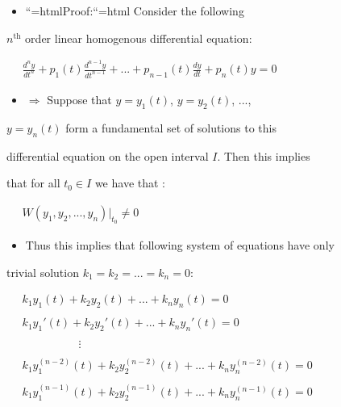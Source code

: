 \begin{itemize}
    \item ``{=html}Proof:``{=html} Consider the following
\end{itemize}
    $n^{\mathrm{th}}$ order linear homogenous differential equation:



$\begin{aligned} \quad \frac{d^ny}{dt^n} + p_1(t) \frac{d^{n-1}y}{dt^{n-1}} + ... + p_{n-1}(t) \frac{dy}{dt} + p_n(t)y = 0 \end{aligned}$



\begin{itemize}
    \item $\Rightarrow$ Suppose that $y = y_1(t)$, $y = y_2(t)$, ...,
\end{itemize}
    $y = y_n(t)$ form a fundamental set of solutions to this

    differential equation on the open interval $I$. Then this implies

    that for all $t_0 \in I$ we have that :



$\begin{aligned} \quad W(y_1, y_2, ..., y_n)  \bigg|_{t_0} \neq 0 \end{aligned}$



\begin{itemize}
    \item Thus this implies that following system of equations have only
\end{itemize}
    trivial solution $k_1 = k_2 = ... = k_n = 0$:



$\begin{aligned} \quad k_1y_1(t) + k_2y_2(t) + ... + k_ny_n(t) = 0 \\\\ \quad k_1y_1'(t) + k_2y_2'(t) + ... + k_ny_n'(t) = 0 \\\\ \quad \quad \quad \quad \quad \quad \vdots \quad \quad \quad \quad \quad \quad \\\\ \quad k_1y_1^{(n-2)}(t) + k_2y_2^{(n-2)}(t) + ... + k_ny_n^{(n-2)}(t) = 0 \\\\ \quad k_1y_1^{(n-1)}(t) + k_2y_2^{(n-1)}(t) + ... + k_ny_n^{(n-1)}(t) = 0 \end{aligned}$




